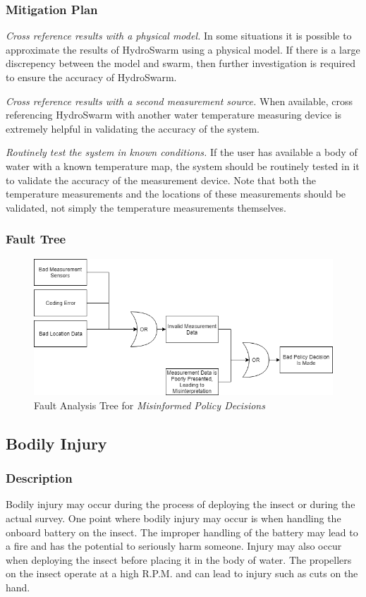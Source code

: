 \documentclass[11pt]{article}
\begin{document}
\subsubsection*{Mitigation Plan}
\textit{Cross reference results with a physical model.} In some situations it is possible to
approximate the results of HydroSwarm using a physical model. If there is a large discrepency
between the model and swarm, then further investigation is required to ensure the accuracy of
HydroSwarm.

\textit{Cross reference results with a second measurement source.} When available, cross referencing
HydroSwarm with another water temperature measuring device is extremely helpful in validating
the accuracy of the system.

\textit{Routinely test the system in known conditions.} If the user has available a body of water
with a known temperature map, the system should be routinely tested in it to validate the
accuracy of the measurement device. Note that both the temperature measurements and the locations
of these measurements should be validated, not simply the temperature measurements themselves.
\subsubsection*{Fault Tree}
\begin{figure}[H]
   \centering
   \includegraphics[width=1\textwidth]{Diagrams/Faul Tree - Bad Policy Decision.png} %
   \caption{Fault Analysis Tree for \textit{Misinformed Policy Decisions}}
   \label{fig:ft-Air}
\end{figure}

\subsection{Bodily Injury}
\subsubsection*{Description}
Bodily injury may occur during the process of deploying the insect or during the actual survey. One point where bodily injury may occur is when handling the onboard battery on the insect. The improper handling of the battery may lead to a fire and has the potential to seriously harm someone. Injury may also occur when deploying the insect before placing it in the body of water. The propellers on the insect operate at a high R.P.M. and can lead to injury such as cuts on the hand.
\end{document}

